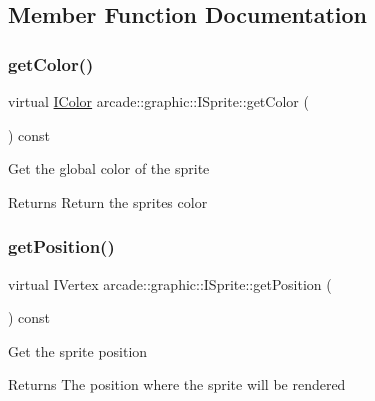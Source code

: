 \subsection{Member Function Documentation}
\mbox{\label{classarcade_1_1graphic_1_1_i_sprite_ac1d2f9de8387466857b06ad49bacae45}} 
\subsubsection{\texorpdfstring{getColor()}{getColor()}}
{\footnotesize\ttfamily virtual \mbox{\hyperlink{classarcade_1_1graphic_1_1_i_color}{I\+Color}} arcade\+::graphic\+::\+I\+Sprite\+::get\+Color (\begin{DoxyParamCaption}{ }\end{DoxyParamCaption}) const\hspace{0.3cm}{\ttfamily [pure virtual]}}

Get the global color of the sprite \begin{DoxyReturn}{Returns}
Return the sprite\textquotesingle{}s color 
\end{DoxyReturn}
\mbox{\label{classarcade_1_1graphic_1_1_i_sprite_a44047f1697c3bebbf808a239677d33e1}} 
\subsubsection{\texorpdfstring{getPosition()}{getPosition()}}
{\footnotesize\ttfamily virtual I\+Vertex arcade\+::graphic\+::\+I\+Sprite\+::get\+Position (\begin{DoxyParamCaption}{ }\end{DoxyParamCaption}) const\hspace{0.3cm}{\ttfamily [pure virtual]}}

Get the sprite position \begin{DoxyReturn}{Returns}
The position where the sprite will be rendered 
\end{DoxyReturn}
\mbox{\label{classarcade_1_1graphic_1_1_i_sprite_a2ea4c49f5da9b17a500074ab1378f7ff}} 
